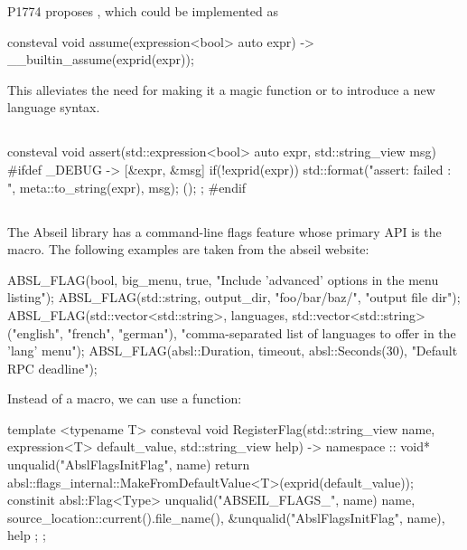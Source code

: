 \documentclass{wg21}
\begin{document}
P1774 \cite{P1774R0} proposes , which
could be implemented as 

\begin{colorblock}
consteval void assume(expression<bool> auto expr) {
    -> __builtin_assume(exprid(expr));
}
\end{colorblock}

This alleviates the need for making it a magic function or to introduce a new language syntax.

\subsection{}

\begin{colorblock}
consteval void assert(std::expression<bool> auto expr, std::string_view msg) {
#ifdef _DEBUG
    -> { [&expr, &msg]{ 
            if(!exprid(expr)) {
                std::format("assert: {} failed : {}", meta::to_string(expr), msg);
            }
        }();
    };
#endif    
}
\end{colorblock}


\subsection{}

The Abseil library has a command-line flags feature whose primary API is the  macro.
The following examples are taken from the abseil website:


\begin{colorblock}
ABSL_FLAG(bool, big_menu, true,
    "Include 'advanced' options in the menu listing");
ABSL_FLAG(std::string, output_dir, "foo/bar/baz/", "output file dir");
ABSL_FLAG(std::vector<std::string>, languages,
    std::vector<std::string>({"english", "french", "german"}),
    "comma-separated list of languages to offer in the 'lang' menu");
ABSL_FLAG(absl::Duration, timeout, absl::Seconds(30), "Default RPC deadline");
\end{colorblock}

Instead of a macro, we can use a  function:

\begin{colorblock}
template <typename T>
consteval void RegisterFlag(std::string_view name, 
                            expression<T> default_value,
                            std::string_view help) {
    -> namespace :: {
        void* unqualid("AbslFlagsInitFlag", name) {
            return absl::flags_internal::MakeFromDefaultValue<T>(exprid(default_value));
        }
        constinit absl::Flag<Type> unqualid("ABSEIL_FLAGS_", name) {
            name, 
            source_location::current().file_name(),
            &unqualid("AbslFlagsInitFlag", name),
            help
        };
    };
}
\end{colorblock}
\end{document}
